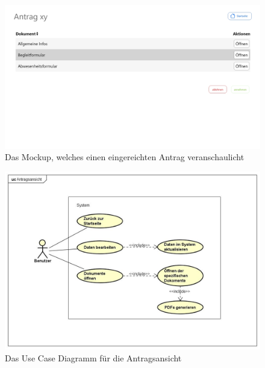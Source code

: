 \begin{figure}[H]
	\centering
	\includegraphics[width=1\linewidth]{images/Mockup-Antragsansicht}
	\caption[Mockup Antragsansicht]{Das Mockup, welches einen eingereichten Antrag veranschaulicht}
	\label{fig:mockupAntrag}
\end{figure}
\begin{figure}[H]
	\centering
	\includegraphics[width=1\linewidth]{images/uc-antrag}
	\caption[Use Case Diagramm Antragsansicht]{Das Use Case Diagramm für die Antragsansicht}
	\label{fig:ucAntrag}
\end{figure}